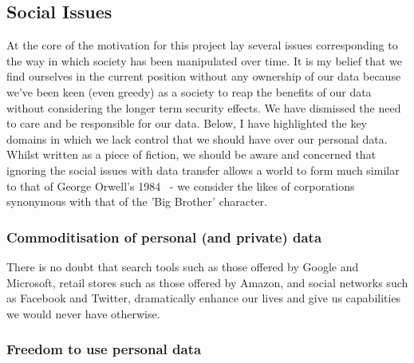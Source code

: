 \subsection{Social Issues}

At the core of the motivation for this project lay several issues corresponding to the way in which society has been manipulated over time. It is my belief that we find ourselves in the current position without any ownership of our data because we've been keen (even greedy) as a society to reap the benefits of our data without considering the longer term security effects. We have dismissed the need to care and be responsible for our data. Below, I have highlighted the key domains in which we lack control that we should have over our personal data. Whilst written as a piece of fiction, we should be aware and concerned that ignoring the social issues with data transfer allows a world to form much similar to that of George Orwell's 1984~\autocite{orwell:1984:book} - we consider the likes of corporations synonymous with that of the 'Big Brother' character.

\subsubsection{Commoditisation of personal (and private) data}

There is no doubt that search tools such as those offered by Google and Microsoft, retail stores such as those offered by Amazon, and social networks such as Facebook and Twitter, dramatically enhance our lives and give us capabilities we would never have otherwise.

\subsubsection{Freedom to use personal data}

